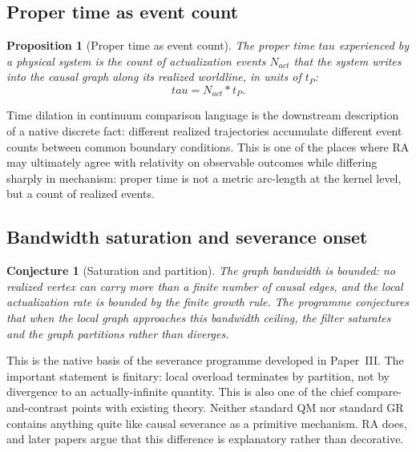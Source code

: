 \documentclass[11pt]{article}
\def\tau{tau}%
\def\mathrm#1{#1}%
\def\cdot{*}%
\newtheorem{proposition}{Proposition}
\newtheorem{conjecture}{Conjecture}
\begin{document}
\subsection{Proper time as event count}

\begin{proposition}[Proper time as event count]
\label{prop:proper_time}
The proper time $\tau$ experienced by a physical system is the count of actualization events $N_{\mathrm{act}}$ that the system writes into the causal graph along its realized worldline, in units of $t_P$:
\begin{equation}
\tau = N_{\mathrm{act}} \cdot t_P.
\end{equation}
\end{proposition}

Time dilation in continuum comparison language is the downstream description of a native discrete fact: different realized trajectories accumulate different event counts between common boundary conditions. This is one of the places where RA may ultimately agree with relativity on observable outcomes while differing sharply in mechanism: proper time is not a metric arc-length at the kernel level, but a count of realized events.

\subsection{Bandwidth saturation and severance onset}

\begin{conjecture}[Saturation and partition]
\label{conj:singularity}
The graph bandwidth is bounded: no realized vertex can carry more than a finite number of causal edges, and the local actualization rate is bounded by the finite growth rule. The programme conjectures that when the local graph approaches this bandwidth ceiling, the filter saturates and the graph partitions rather than diverges.
\end{conjecture}

This is the native basis of the severance programme developed in Paper~III. The important statement is finitary: local overload terminates by partition, not by divergence to an actually-infinite quantity. This is also one of the chief compare-and-contrast points with existing theory. Neither standard QM nor standard GR contains anything quite like causal severance as a primitive mechanism. RA does, and later papers argue that this difference is explanatory rather than decorative.
\end{document}

